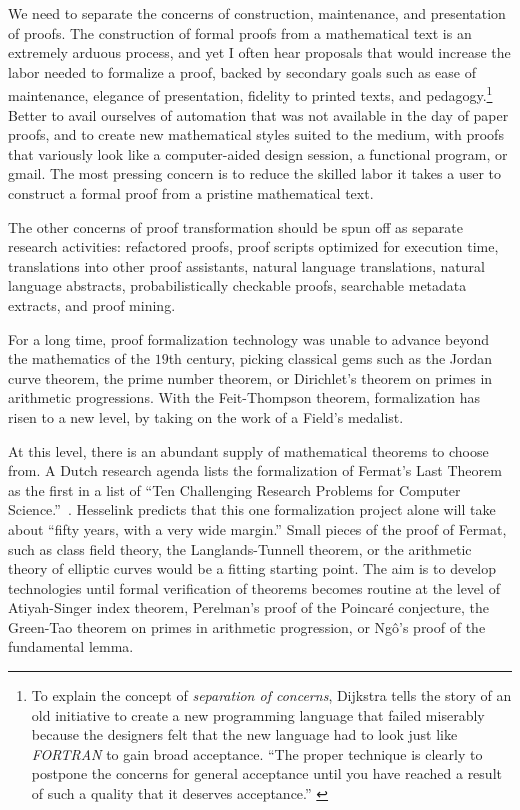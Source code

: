 \documentclass{llncs}
\begin{document}
We need to separate the concerns of construction, maintenance, and
presentation of proofs.  The construction of formal proofs from a
mathematical text is an extremely arduous process, and yet I often
hear proposals that would increase the labor needed to formalize a
proof, backed by secondary goals such as ease of maintenance, elegance
of presentation, fidelity to printed texts, and pedagogy.\footnote{%
  To explain the concept of {\it separation of concerns}, Dijkstra
  tells the story of an old initiative to create a new programming
  language that failed miserably because the designers felt that the
  new language had to look just like {\it FORTRAN} to gain broad
  acceptance. ``The proper technique is clearly to postpone the
  concerns for general acceptance until you have reached a result of
  such a quality that it deserves acceptance.''
  \cite{DijkST}} 
Better to avail ourselves of automation that was not available in the
day of paper proofs, and to create new mathematical styles suited to
the medium, with proofs that variously look like a
computer-aided design session, a functional program, or gmail.
The most pressing concern is to 
reduce the skilled labor it takes a user to construct a formal proof
from a pristine mathematical text.

The other concerns of proof transformation should be spun off as separate
research activities: refactored proofs,
proof scripts optimized for execution time, translations into other
proof assistants, natural language translations, natural language
abstracts, probabilistically checkable proofs, searchable metadata
extracts, and proof mining.


\bigskip

For a long time, proof formalization technology was unable to advance
beyond the mathematics of the $19$th century, picking classical gems
such as the Jordan curve theorem, the prime number theorem, or
Dirichlet's theorem on primes in arithmetic progressions.  With the
Feit-Thompson theorem, formalization has risen to a new level, by
taking on the work of a Field's medalist.

At this level, there is an abundant supply of mathematical theorems to
choose from.  A Dutch research agenda 
lists the formalization of Fermat's Last Theorem as the first in a
list of ``Ten Challenging Research Problems for Computer
Science.''~\cite{Berg}.  Hesselink predicts that this one
formalization project alone will take about ``fifty years, with a very
wide margin.''
Small pieces of the proof of Fermat, such as class field theory, the
Langlands-Tunnell theorem, or the arithmetic theory of elliptic curves
would be a fitting starting point.  The aim is to develop technologies
until formal verification of theorems becomes routine at the level of
Atiyah-Singer index theorem, Perelman's proof of the Poincar\'e
conjecture, the Green-Tao theorem on primes in arithmetic progression,
or Ng\^o's proof of the fundamental lemma.
\end{document}
